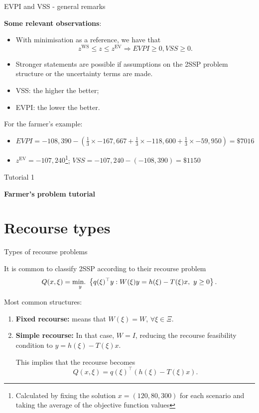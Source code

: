 	
\begin{frame}{EVPI and VSS - general remarks}

	{\bf Some relevant observations}:
	\vspace{-6pt}
	\begin{itemize}
		\item With minimisation as a reference, we have that
		$$
			z^{\text{WS}} \le z \le z^{\text{EV}} \Rightarrow EVPI \ge 0, VSS \ge 0.
		$$
		\item Stronger statements are possible if assumptions on the 2SSP problem structure or the uncertainty terms are made.
		\item VSS: the \alert{higher} the better;
		\item EVPI: the \alert{lower} the better.
	\end{itemize}
	
	\pause
	For the farmer's example:
	\vspace{-6pt}
	\begin{itemize}
		\item $EVPI = -108,390- \left(\frac{1}{3}\times -167,667 + \frac{1}{3}\times -118,600 + \frac{1}{3}\times -59,950\right)  = \$7016$ 
		\item $z^{\text{EV}} = -107,240$\footnote{Calculated by fixing the solution $x=(120,80,300)$ for each scenario and taking the average of the objective function values}; $VSS = -107,240 - (-108,390) = \$1150$
	\end{itemize}
	\vspace{6pt}
\end{frame}


\begin{frame}{Tutorial 1}

\centering
\large
\bf 
Farmer's problem tutorial

	
\end{frame}


\section{Recourse types}


\begin{frame}{Types of recourse problems}

	It is common to classify 2SSP according to their \alert{recourse problem} 
	\begin{equation*}
		Q(x, \xi) = \mathop{\text{min.} \ }_y \left\{  q(\xi)^\top y : W(\xi)y = h(\xi) - T(\xi)x, \ y \ge 0 \right \}.	
	\end{equation*}
	
	Most common structures:
	\begin{enumerate}[<+->]
		\item {\bf Fixed recourse:} means that $W(\xi) = W$, $\forall \xi \in \Xi$.
		\item {\bf Simple recourse:} In that case, $W = I$, reducing the recourse feasibility condition to $y = h(\xi) - T(\xi)x$. 
		\vspace{6pt}
		
		This implies that the recourse becomes
		$$
		 Q(x,\xi) = q(\xi)^\top \left(h(\xi) - T(\xi)x\right).
		$$ 
	\end{enumerate} 
	
\end{frame}


